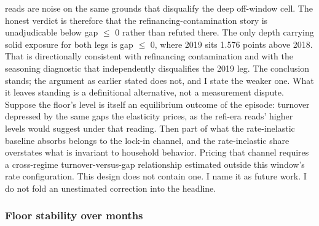\documentclass[12pt]{article}
\begin{document}
reads are noise on the same grounds that disqualify the deep off-window cell. The honest verdict is therefore that the refinancing-contamination story is unadjudicable below gap $\leq$ 0 rather than refuted there. The only depth carrying solid exposure for both legs is gap $\leq$ 0, where 2019 sits 1.576 points above 2018. That is directionally consistent with refinancing contamination and with the seasoning diagnostic that independently disqualifies the 2019 leg. The conclusion stands; the argument as earlier stated does not, and I state the weaker one. What it leaves standing is a definitional alternative, not a measurement dispute. Suppose the floor's level is itself an equilibrium outcome of the episode: turnover depressed by the same gaps the elasticity prices, as the refi-era reads' higher levels would suggest under that reading. Then part of what the rate-inelastic baseline absorbs belongs to the lock-in channel, and the rate-inelastic share overstates what is invariant to household behavior. Pricing that channel requires a cross-regime turnover-versus-gap relationship estimated outside this window's rate configuration. This design does not contain one. I name it as future work. I do not fold an unestimated correction into the headline.

\subsubsection{Floor stability over months}
\end{document}
